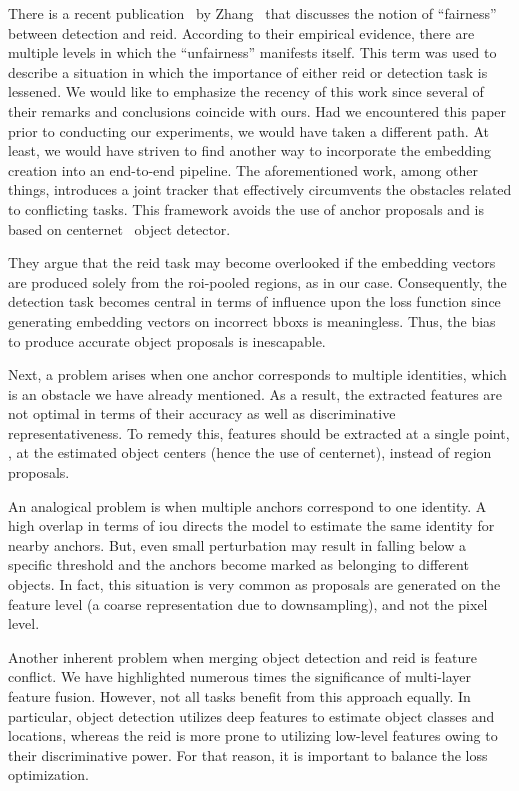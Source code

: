 There is a recent publication~\cite{zhang2021fairmot} by Zhang~\etal{} that discusses the notion of ``fairness'' between detection and \gls{reid}. According to their empirical evidence, there are multiple levels in which the ``unfairness'' manifests itself. This term was used to describe a situation in which the importance of either \gls{reid} or detection task is lessened. We would like to emphasize the recency of this work since several of their remarks and conclusions coincide with ours. Had we encountered this paper prior to conducting our experiments, we would have taken a different path. At least, we would have striven to find another way to incorporate the embedding creation into an end-to-end pipeline. The aforementioned work, among other things, introduces a joint tracker that effectively circumvents the obstacles related to conflicting tasks. This framework avoids the use of anchor proposals and is based on \gls{centernet}~\cite{zhou2019centernet} object detector.

They argue that the \gls{reid} task may become overlooked if the embedding vectors are produced solely from the \gls{roi}-pooled regions, as in our case. Consequently, the detection task becomes central in terms of influence upon the loss function since generating embedding vectors on incorrect \glspl{bbox} is meaningless. Thus, the bias to produce accurate object proposals is inescapable.

Next, a problem arises when one anchor corresponds to multiple identities, which is an obstacle we have already mentioned. As a result, the extracted features are not optimal in terms of their accuracy as well as discriminative representativeness. To remedy this, features should be extracted at a single point, \ietext{}, at the estimated object centers (hence the use of \gls{centernet}), instead of region proposals.

An analogical problem is when multiple anchors correspond to one identity. A high overlap in terms of \gls{iou} directs the model to estimate the same identity for nearby anchors. But, even small perturbation may result in falling below a specific threshold and the anchors become marked as belonging to different objects. In fact, this situation is very common as proposals are generated on the feature level (a coarse representation due to downsampling), and not the pixel level.

Another inherent problem when merging object detection and \gls{reid} is feature conflict. We have highlighted numerous times the significance of multi-layer feature fusion. However, not all tasks benefit from this approach equally. In particular, object detection utilizes deep features to estimate object classes and locations, whereas the \gls{reid} is more prone to utilizing low-level features owing to their discriminative power. For that reason, it is important to balance the loss optimization.

